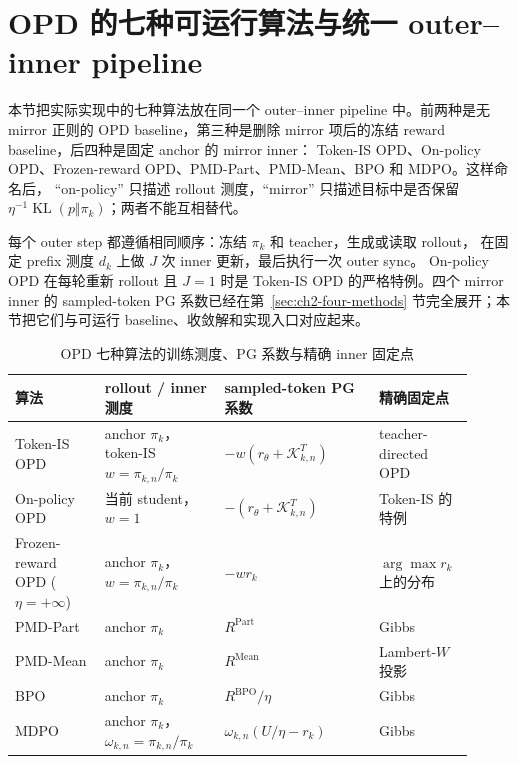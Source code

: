 \section{OPD 的七种可运行算法与统一 outer--inner pipeline}
\label{sec:ch2-opd-baselines}

本节把实际实现中的七种算法放在同一个 outer--inner pipeline 中。前两种是无
mirror 正则的 OPD baseline，第三种是删除 mirror 项后的冻结 reward baseline，后四种是固定 anchor 的 mirror inner：
Token-IS OPD、On-policy OPD、Frozen-reward OPD、PMD-Part、PMD-Mean、BPO 和 MDPO。这样命名后，
``on-policy'' 只描述 rollout 测度，``mirror'' 只描述目标中是否保留
$\eta^{-1}\operatorname{KL}(p\Vert\pi_k)$；两者不能互相替代。

每个 outer step 都遵循相同顺序：冻结 $\pi_k$ 和 teacher，生成或读取 rollout，
在固定 prefix 测度 $d_k$ 上做 $J$ 次 inner 更新，最后执行一次 outer sync。
On-policy OPD 在每轮重新 rollout 且 $J=1$ 时是 Token-IS OPD 的严格特例。四个
mirror inner 的 sampled-token PG 系数已经在第~\ref{sec:ch2-four-methods}
节完全展开；本节把它们与可运行 baseline、收敛解和实现入口对应起来。

\begin{table}[ht]
\centering
\caption{OPD 七种算法的训练测度、PG 系数与精确 inner 固定点}
\label{tab:ch2-opd-seven-algorithms}
\begin{tabular}{p{0.18\linewidth}p{0.24\linewidth}p{0.31\linewidth}p{0.18\linewidth}}
\toprule
算法 & rollout / inner 测度 & sampled-token PG 系数 & 精确固定点 \\
\midrule
Token-IS OPD & anchor $\pi_k$，token-IS $w=\pi_{k,n}/\pi_k$ & $-w(r_\theta+\mathcal K_{k,n}^{T})$ & teacher-directed OPD \\
On-policy OPD & 当前 student，$w=1$ & $-(r_\theta+\mathcal K_{k,n}^{T})$ & Token-IS 的特例 \\
Frozen-reward OPD ($\eta=+\infty$) & anchor $\pi_k$，$w=\pi_{k,n}/\pi_k$ & $-w r_k$ & $\arg\max r_k$ 上的分布 \\
PMD-Part & anchor $\pi_k$ & $R^{\mathrm{Part}}$ & Gibbs \\
PMD-Mean & anchor $\pi_k$ & $R^{\mathrm{Mean}}$ & Lambert-$W$ 投影 \\
BPO & anchor $\pi_k$ & $R^{\mathrm{BPO}}/\eta$ & Gibbs \\
MDPO & anchor $\pi_k$，$\omega_{k,n}=\pi_{k,n}/\pi_k$ & $\omega_{k,n}(U/\eta-r_k)$ & Gibbs \\
\bottomrule
\end{tabular}
\end{table}


